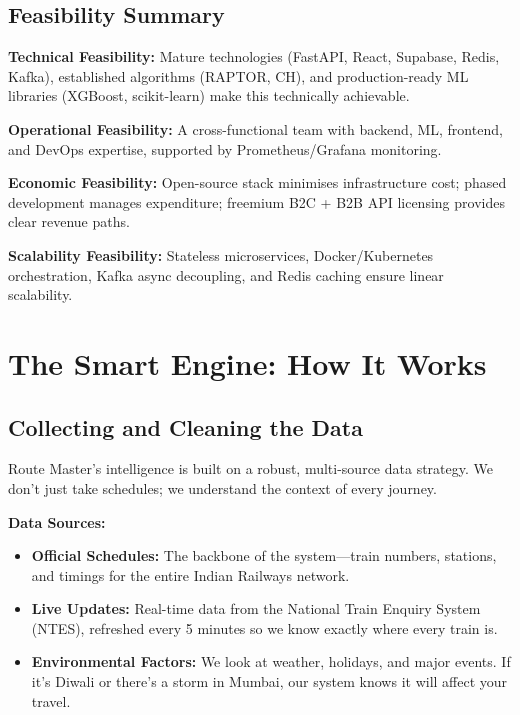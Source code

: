 \documentclass[12pt,a4paper]{report}
\begin{document}
\section{Feasibility Summary}

\textbf{Technical Feasibility:} Mature technologies (FastAPI, React, Supabase, Redis, Kafka), established algorithms (RAPTOR, CH), and production-ready ML libraries (XGBoost, scikit-learn) make this technically achievable.

\textbf{Operational Feasibility:} A cross-functional team with backend, ML, frontend, and DevOps expertise, supported by Prometheus/Grafana monitoring.

\textbf{Economic Feasibility:} Open-source stack minimises infrastructure cost; phased development manages expenditure; freemium B2C + B2B API licensing provides clear revenue paths.

\textbf{Scalability Feasibility:} Stateless microservices, Docker/Kubernetes orchestration, Kafka async decoupling, and Redis caching ensure linear scalability.

\chapter{The Smart Engine: How It Works}

\section{Collecting and Cleaning the Data}

Route Master's intelligence is built on a robust, multi-source data strategy. We don't just take schedules; we understand the context of every journey.

\textbf{Data Sources:}
\begin{itemize}[leftmargin=1.5em]
  \item \textbf{Official Schedules:} The backbone of the system---train numbers, stations, and timings for the entire Indian Railways network.
  \item \textbf{Live Updates:} Real-time data from the National Train Enquiry System (NTES), refreshed every 5 minutes so we know exactly where every train is.
  \item \textbf{Environmental Factors:} We look at weather, holidays, and major events. If it's Diwali or there's a storm in Mumbai, our system knows it will affect your travel.
\end{itemize}
\end{document}
